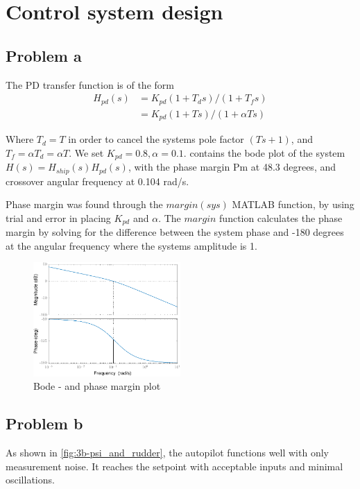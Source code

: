 \section{Control system design}
\subsection{Problem a}



The PD transfer function is of the form
\begin{align*}
    H_{pd}(s) &= K_{pd}(1+T_d s)/(1+T_f s) \\
              &= K_{pd}(1+T s)/(1+\alpha T s)
\end{align*}

Where $T_d = T$ in order to cancel the systems pole factor $(Ts + 1)$, and $T_f = \alpha T_d = \alpha T$. We set $K_{pd} = 0.8, \alpha = 0.1$.  contains the bode plot of the system $H(s) = H_{ship}(s)H_{pd}(s)$, with the phase margin Pm at 48.3 degrees, and crossover angular frequency at 0.104 rad/s.

Phase margin was found through the $margin(sys)$ MATLAB function, by using trial and error in placing $K_{pd}$ and $\alpha$. The $margin$ function calculates the phase margin by solving for the difference between the system phase and -180 degrees at the angular frequency where the systems amplitude is 1. 

\begin{figure}[ht]
    \centering
    \includegraphics[width=0.5\textwidth]{images/3a-bode_and_phasemargin}
    \caption{Bode - and phase margin plot}
    \label{fig:3a-bode_and_phasemargin}
\end{figure}

\subsection{Problem b}
As shown in \cref{fig:3b-psi_and_rudder}, the autopilot functions well with only measurement noise.  It reaches the setpoint with acceptable inputs and minimal oscillations.

